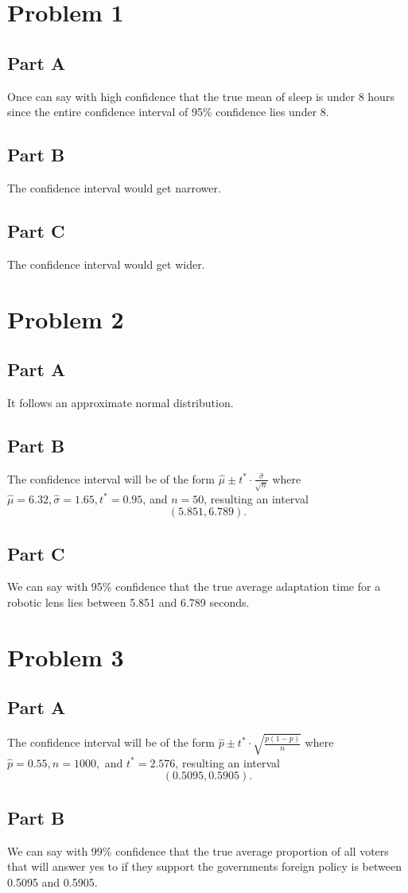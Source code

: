\documentclass[12pt]{extarticle}
\begin{document}
\section*{Problem 1}
\subsection*{Part A}
Once can say with high confidence that the true mean of sleep is under 8 hours since the entire confidence interval of 95\% confidence lies under 8.

\subsection*{Part B}
The confidence interval would get narrower.

\subsection*{Part C}
The confidence interval would get wider.

\section*{Problem 2}
\subsection*{Part A}
It follows an approximate normal distribution.

\subsection*{Part B}
The confidence interval will be of the form $\hat{\mu} \pm t^* \cdot \frac{\hat{\sigma}}{\sqrt{n}}$ where $\hat{\mu} = 6.32, \hat{\sigma} = 1.65, t^* = 0.95$, and $n = 50$, resulting an interval
\[
	(5.851, 6.789)
.\]

\subsection*{Part C}
We can say with 95\% confidence that the true average adaptation time for a robotic lens lies between 5.851 and 6.789 seconds.

\section*{Problem 3}
\subsection*{Part A}
The confidence interval will be of the form $\hat{p} \pm t^* \cdot \sqrt{\frac{p(1-p)}{n}}$ where $\hat{p} = 0.55, n = 1000,$ and $t^* = 2.576$, resulting an interval
\[
	(0.5095, 0.5905)
.\]

\subsection*{Part B}
We can say with 99\% confidence that the true average proportion of all voters that will answer yes to if they support the governments foreign policy is between 0.5095 and 0.5905.
\end{document}
